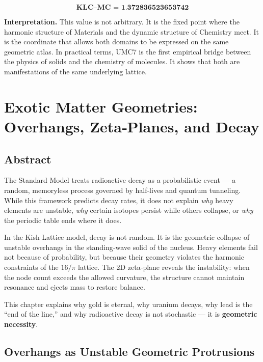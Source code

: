 \documentclass[11pt, letterpaper, openany]{book}
\begin{document}
\[
\textbf{KLC–MC = 1.372836523653742}
\]



\noindent\textbf{Interpretation.}  
This value is not arbitrary. It is the fixed point where the harmonic structure of Materials and the
dynamic structure of Chemistry meet. It is the coordinate that allows both domains to be expressed
on the same geometric atlas.  
In practical terms, UMC7 is the first empirical bridge between the physics of solids and the
chemistry of molecules. It shows that both are manifestations of the same underlying lattice.

\chapter{Exotic Matter Geometries: Overhangs, Zeta‑Planes, and Decay}

\section{Abstract}

The Standard Model treats radioactive decay as a probabilistic event — a random,
memoryless process governed by half‑lives and quantum tunneling. While this framework
predicts decay rates, it does not explain \textit{why} heavy elements are unstable, \textit{why}
certain isotopes persist while others collapse, or \textit{why} the periodic table ends where it
does.

In the Kish Lattice model, decay is not random. It is the geometric collapse of unstable
overhangs in the standing‑wave solid of the nucleus. Heavy elements fail not because of
probability, but because their geometry violates the harmonic constraints of the $16/\pi$
lattice. The 2D zeta‑plane reveals the instability: when the node count exceeds the
allowed curvature, the structure cannot maintain resonance and ejects mass to restore
balance.

This chapter explains why gold is eternal, why uranium decays, why lead is the “end of
the line,” and why radioactive decay is not stochastic — it is \textbf{geometric necessity}.

\section{Overhangs as Unstable Geometric Protrusions}
\end{document}
